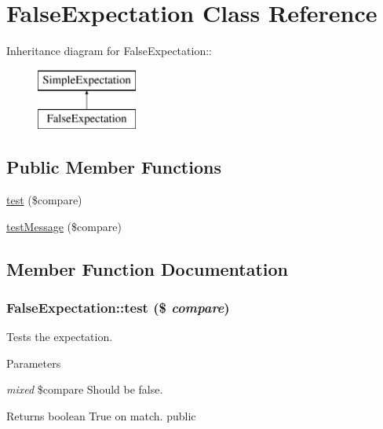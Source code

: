 \hypertarget{class_false_expectation}{
\section{FalseExpectation Class Reference}
\label{class_false_expectation}
}
Inheritance diagram for FalseExpectation::\begin{figure}[H]
\begin{center}
\leavevmode
\includegraphics[height=2cm]{class_false_expectation}
\end{center}
\end{figure}
\subsection*{Public Member Functions}
\begin{DoxyCompactItemize}
\item 
\hyperlink{class_false_expectation_aabecb220dd0d3768ea8250aa280e5c34}{test} (\$compare)
\item 
\hyperlink{class_false_expectation_aa7d2b7dadaa82d40c41914780804416f}{testMessage} (\$compare)
\end{DoxyCompactItemize}


\subsection{Member Function Documentation}
\hypertarget{class_false_expectation_aabecb220dd0d3768ea8250aa280e5c34}{
\subsubsection[{test}]{\setlength{\rightskip}{0pt plus 5cm}FalseExpectation::test (\$ {\em compare})}}
\label{class_false_expectation_aabecb220dd0d3768ea8250aa280e5c34}
Tests the expectation. 
\begin{DoxyParams}{Parameters}
\item[{\em mixed}]\$compare Should be false. \end{DoxyParams}
\begin{DoxyReturn}{Returns}
boolean True on match.  public 
\end{DoxyReturn}


